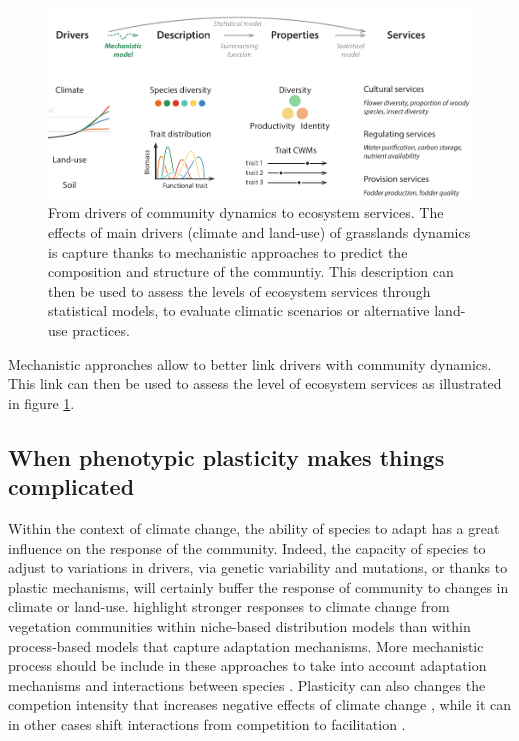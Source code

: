  
 
\begin{figure}
    \includegraphics[width=1\linewidth]{./1_Introduction/graphics/drivers_to_services.pdf}
  \caption[From drivers to ecosystem services]{From drivers of community dynamics to ecosystem services. The effects of main drivers (climate and land-use) of grasslands dynamics is capture thanks to mechanistic approaches to predict the composition and structure of the communtiy. This description can then be used to assess the levels of ecosystem services through statistical models, to evaluate climatic scenarios or alternative land-use practices.}
  \label{fig:drivers2services}
\end{figure}

Mechanistic approaches allow to better link drivers with community dynamics. This link can then be used to assess the level of ecosystem services as illustrated in figure \ref{fig:drivers2services}.




\subsection{When phenotypic plasticity makes things complicated}

Within the context of climate change, the ability of species to adapt has a great influence on the response of the community. Indeed, the capacity of species to adjust to variations in drivers, via genetic variability and mutations, or thanks to plastic mechanisms, will certainly buffer the response of community to changes in climate or land-use. \cite{morin_comparing_2009} highlight stronger responses to climate change from vegetation communities within niche-based distribution models than within process-based models that capture adaptation mechanisms. More mechanistic process should be include in these approaches \parencite{evans_toward_2016} to take into account adaptation mechanisms and interactions between species \parencite{gilman_framework_2010}. Plasticity can also changes the competion intensity that increases negative effects of climate change  \parencite{hanel_phenotypic_2015}, while it can in other cases shift interactions from competition to facilitation  \cite{callaway_phenotypic_2003}.

